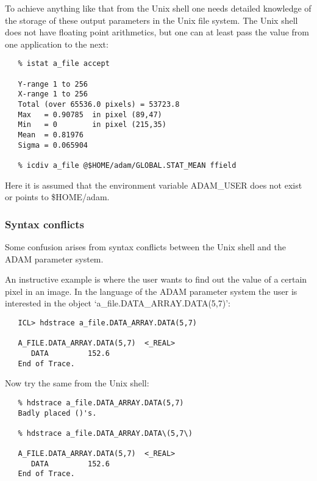    To achieve anything like that from the Unix shell one needs detailed
   knowledge of the storage of these output parameters in the Unix file
   system. The Unix shell does not have floating point arithmetics, but
   one can at least pass the value from one application to the next:

\begin{verbatim}
   % istat a_file accept

   Y-range 1 to 256
   X-range 1 to 256
   Total (over 65536.0 pixels) = 53723.8
   Max   = 0.90785  in pixel (89,47)
   Min   = 0        in pixel (215,35)
   Mean  = 0.81976
   Sigma = 0.065904

   % icdiv a_file @$HOME/adam/GLOBAL.STAT_MEAN ffield
\end{verbatim}

   Here it is assumed that the environment variable ADAM\_USER does not
   exist or points to \$HOME/adam.


\subsubsection{\label{paramssyntax}Syntax conflicts}

   Some confusion arises from syntax conflicts between the Unix shell
   and the ADAM parameter system.

   An instructive example is where the user wants to find out the value
   of a certain pixel in an image. In the language of
   the ADAM parameter system the user is interested in the object
   `a\_file.DATA\_ARRAY.DATA(5,7)':

\begin{verbatim}
   ICL> hdstrace a_file.DATA_ARRAY.DATA(5,7)

   A_FILE.DATA_ARRAY.DATA(5,7)  <_REAL>
      DATA         152.6
   End of Trace.
\end{verbatim}

   Now try the same from the Unix shell:

\begin{verbatim}
   % hdstrace a_file.DATA_ARRAY.DATA(5,7)
   Badly placed ()'s.

   % hdstrace a_file.DATA_ARRAY.DATA\(5,7\)

   A_FILE.DATA_ARRAY.DATA(5,7)  <_REAL>
      DATA         152.6
   End of Trace.
\end{verbatim}


